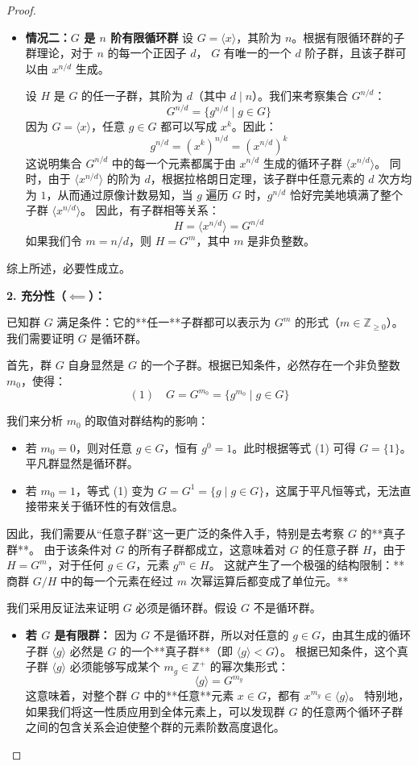\documentclass[]{article}
\begin{document}
\begin{proof}
\begin{itemize}
	\item \textbf{情况二：$G$ 是 $n$ 阶有限循环群}
	设 $G = \langle x \rangle$，其阶为 $n$。根据有限循环群的子群理论，对于 $n$ 的每一个正因子 $d$， $G$ 有唯一的一个 $d$ 阶子群，且该子群可以由 $x^{n/d}$ 生成。
	
	设 $H$ 是 $G$ 的任一子群，其阶为 $d$（其中 $d \mid n$）。我们来考察集合 $G^{n/d}$：
	\[ G^{n/d} = \{ g^{n/d} \mid g \in G \} \]
	因为 $G = \langle x \rangle$，任意 $g \in G$ 都可以写成 $x^k$。因此：
	\[ g^{n/d} = (x^k)^{n/d} = (x^{n/d})^k \]
	这说明集合 $G^{n/d}$ 中的每一个元素都属于由 $x^{n/d}$ 生成的循环子群 $\langle x^{n/d} \rangle$。
	同时，由于 $\langle x^{n/d} \rangle$ 的阶为 $d$，根据拉格朗日定理，该子群中任意元素的 $d$ 次方均为 $1$，从而通过原像计数易知，当 $g$ 遍历 $G$ 时，$g^{n/d}$ 恰好完美地填满了整个子群 $\langle x^{n/d} \rangle$。
	因此，有子群相等关系：
	\[ H = \langle x^{n/d} \rangle = G^{n/d} \]
	如果我们令 $m = n/d$，则 $H = G^m$，其中 $m$ 是非负整数。
\end{itemize}
综上所述，必要性成立。

\bigskip
\noindent \textbf{2. 充分性（$\impliedby$）：}

已知群 $G$ 满足条件：它的**任一**子群都可以表示为 $G^m$ 的形式（$m \in \mathbb{Z}_{\ge 0}$）。我们需要证明 $G$ 是循环群。

首先，群 $G$ 自身显然是 $G$ 的一个子群。根据已知条件，必然存在一个非负整数 $m_0$，使得：
\[ (1) \quad G = G^{m_0} = \{ g^{m_0} \mid g \in G \} \]

我们来分析 $m_0$ 的取值对群结构的影响：
\begin{itemize}
	\item 若 $m_0 = 0$，则对任意 $g \in G$，恒有 $g^0 = 1$。此时根据等式 (1) 可得 $G = \{1\}$。平凡群显然是循环群。
	\item 若 $m_0 = 1$，等式 (1) 变为 $G = G^1 = \{g \mid g \in G\}$，这属于平凡恒等式，无法直接带来关于循环性的有效信息。
\end{itemize}

因此，我们需要从“任意子群”这一更广泛的条件入手，特别是去考察 $G$ 的**真子群**。
由于该条件对 $G$ 的所有子群都成立，这意味着对 $G$ 的任意子群 $H$，由于 $H = G^m$，对于任何 $g \in G$，元素 $g^m \in H$。
这就产生了一个极强的结构限制：**商群 $G/H$ 中的每一个元素在经过 $m$ 次幂运算后都变成了单位元。**

我们采用反证法来证明 $G$ 必须是循环群。假设 $G$ 不是循环群。

\begin{itemize}
	\item \textbf{若 $G$ 是有限群：}
	因为 $G$ 不是循环群，所以对任意的 $g \in G$，由其生成的循环子群 $\langle g \rangle$ 必然是 $G$ 的一个**真子群**（即 $\langle g \rangle < G$）。
	根据已知条件，这个真子群 $\langle g \rangle$ 必须能够写成某个 $m_g \in \mathbb{Z}^+$ 的幂次集形式：
	\[ \langle g \rangle = G^{m_g} \]
	这意味着，对整个群 $G$ 中的**任意**元素 $x \in G$，都有 $x^{m_g} \in \langle g \rangle$。
	特别地，如果我们将这一性质应用到全体元素上，可以发现群 $G$ 的任意两个循环子群之间的包含关系会迫使整个群的元素阶数高度退化。
	

\end{itemize}
\end{proof}
\end{document}
